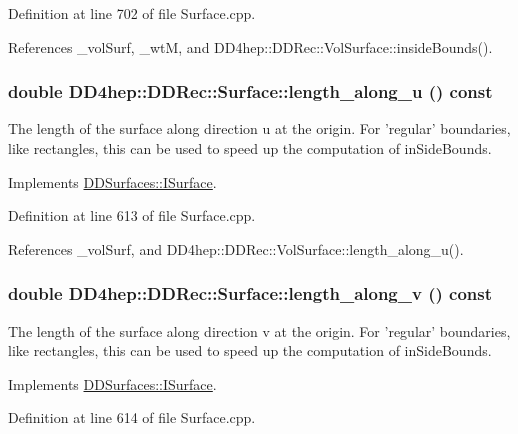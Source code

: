Definition at line 702 of file Surface.cpp.

References \_\-volSurf, \_\-wtM, and DD4hep::DDRec::VolSurface::insideBounds().\hypertarget{class_d_d4hep_1_1_d_d_rec_1_1_surface_a2b027f9ee36a0e5a791b0cfa30199389}{
\subsubsection[{length\_\-along\_\-u}]{\setlength{\rightskip}{0pt plus 5cm}double DD4hep::DDRec::Surface::length\_\-along\_\-u () const}}
\label{class_d_d4hep_1_1_d_d_rec_1_1_surface_a2b027f9ee36a0e5a791b0cfa30199389}
The length of the surface along direction u at the origin. For 'regular' boundaries, like rectangles, this can be used to speed up the computation of inSideBounds. 

Implements \hyperlink{class_d_d_surfaces_1_1_i_surface_a0060710912d3447e296a8e0875690cc9}{DDSurfaces::ISurface}.

Definition at line 613 of file Surface.cpp.

References \_\-volSurf, and DD4hep::DDRec::VolSurface::length\_\-along\_\-u().\hypertarget{class_d_d4hep_1_1_d_d_rec_1_1_surface_a7c24c48062ae82692d31af6430b52ec6}{
\subsubsection[{length\_\-along\_\-v}]{\setlength{\rightskip}{0pt plus 5cm}double DD4hep::DDRec::Surface::length\_\-along\_\-v () const}}
\label{class_d_d4hep_1_1_d_d_rec_1_1_surface_a7c24c48062ae82692d31af6430b52ec6}
The length of the surface along direction v at the origin. For 'regular' boundaries, like rectangles, this can be used to speed up the computation of inSideBounds. 

Implements \hyperlink{class_d_d_surfaces_1_1_i_surface_a9a4682bfa68557d53cfd319cfa54148d}{DDSurfaces::ISurface}.

Definition at line 614 of file Surface.cpp.

